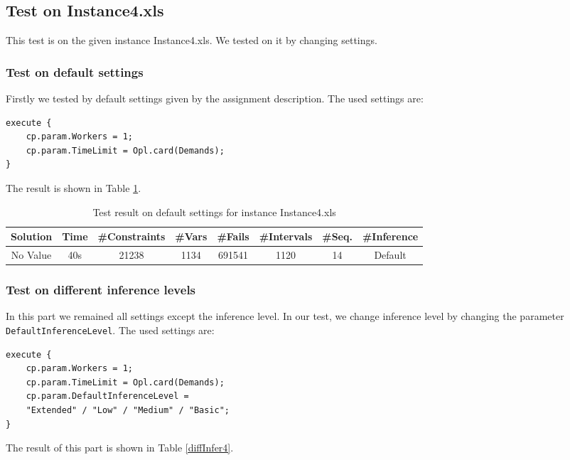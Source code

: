 \documentclass[a4paper, 12pt]{article}
\begin{document}
\subsection{Test on Instance4.xls}

This test is on the given instance Instance4.xls. We tested on it by changing settings. 

\subsubsection{Test on default settings}

Firstly we tested by default settings given by the assignment description. The used settings are: 

\begin{lstlisting}
execute {
    cp.param.Workers = 1;
    cp.param.TimeLimit = Opl.card(Demands); 
}
\end{lstlisting}

The result is shown in Table \ref{default4}. 

\begin{table}
    \centering
    \caption{Test result on default settings for instance Instance4.xls}
    \label{default4}
    \begin{tabular}{|c|c|c|c|c|c|c|c|}
        \hline
        Solution & Time & \#Constraints & \#Vars & \#Fails & \#Intervals & \#Seq. & \#Inference \\
        \hline
        No Value & 40s & 21238 & 1134 & 691541 & 1120 & 14 & Default \\
        \hline
    \end{tabular}
\end{table}

\subsubsection{Test on different inference levels}

In this part we remained all settings except the inference level. In our test, we change inference level by changing the parameter \texttt{DefaultInferenceLevel}. The used settings are: 

\begin{lstlisting}
execute {
    cp.param.Workers = 1;
    cp.param.TimeLimit = Opl.card(Demands); 
    cp.param.DefaultInferenceLevel = 
    "Extended" / "Low" / "Medium" / "Basic";
}
\end{lstlisting}

The result of this part is shown in Table \ref{diffInfer4}. 
\end{document}
